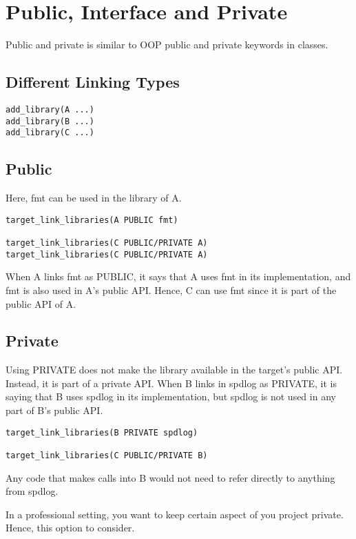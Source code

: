 \section{Public, Interface and Private}

Public and private is similar to OOP public and private keywords in classes.

\subsection{Different Linking Types}

\begin{verbatim}
add_library(A ...)
add_library(B ...)
add_library(C ...)
\end{verbatim}

\subsection{Public}

Here, fmt can be used in the library of A. 

\begin{verbatim}
target_link_libraries(A PUBLIC fmt)

target_link_libraries(C PUBLIC/PRIVATE A)
target_link_libraries(C PUBLIC/PRIVATE A)
\end{verbatim}

When A links fmt as PUBLIC, it says that A uses fmt in its implementation, and fmt is also used in A's public API.
Hence, C can use fmt since it is part of the public API of A.

\subsection{Private}

Using PRIVATE does not make the library available in the target's public API. Instead, it is part of a private API.
When B links in spdlog as PRIVATE, it is saying that B uses spdlog in its implementation,
but spdlog is not used in any part of B's public API. 

\begin{verbatim}
target_link_libraries(B PRIVATE spdlog)

target_link_libraries(C PUBLIC/PRIVATE B)
\end{verbatim}

Any code that makes calls into B would not need to refer directly to anything from
spdlog.


In a professional setting, you want to keep certain aspect of you project private. Hence, this option to consider.

